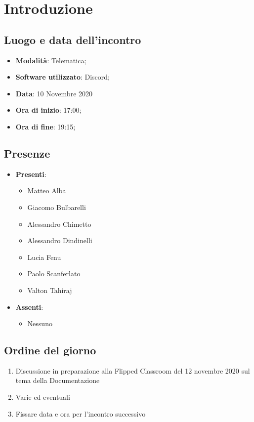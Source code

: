 \documentclass[]{article}
\begin{document}
	
	
	
	\newpage
	
	\section{Introduzione}
		\subsection{Luogo e data dell'incontro}
		\begin{itemize}
			\item \textbf{Modalità}: Telematica;
			\item \textbf{Software utilizzato}: Discord;
			\item \textbf{Data}: 10 Novembre 2020
			\item \textbf{Ora di inizio}: 17:00;
			\item \textbf{Ora di fine}: 19:15;
		\end{itemize}
		
		\subsection{Presenze}
		\begin{itemize}
			\item \textbf{Presenti}: 
			\begin{itemize}
				\item Matteo Alba
				\item Giacomo Bulbarelli
				\item Alessandro Chimetto
				\item Alessandro Dindinelli
				\item Lucia Fenu
				\item Paolo Scanferlato
				\item Valton Tahiraj
			\end{itemize}
			\item \textbf{Assenti}:
			\begin{itemize}
				\item Nessuno
			\end{itemize}
		\end{itemize}
		
		\subsection{Ordine del giorno}
		\begin{enumerate}
			\item Discussione in preparazione alla Flipped Classroom del 12 novembre 2020 sul tema della Documentazione
			\item Varie ed eventuali
			\item Fissare data e ora per l'incontro successivo
		\end{enumerate}
\end{document}
